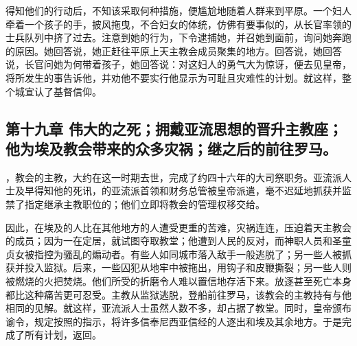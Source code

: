 得知他们的行动后，不知该采取何种措施，便尴尬地随着人群来到平原。一个妇人牵着一个孩子的手，披风拖曳，不合妇女的体统，仿佛有要事似的，从长官率领的士兵队列中挤了过去。注意到她的行为，下令逮捕她，并召她到面前，询问她奔跑的原因。她回答说，她正赶往平原上天主教会成员聚集的地方。回答说，她回答说，长官问她为何带着孩子，她回答说：对这妇人的勇气大为惊讶，便去见皇帝，将所发生的事告诉他，并劝他不要实行他显示为可耻且灾难性的计划。就这样，整个城宣认了基督信仰。\par


\subsection{第十九章 伟大的之死；拥戴亚流思想的晋升主教座；他为埃及教会带来的众多灾祸；继之后的前往罗马。}

，教会的主教，大约在这一时期去世，完成了约四十六年的大司祭职务。亚流派人士及早得知他的死讯，的亚流派首领和财务总管被皇帝派遣，毫不迟延地抓获并监禁了指定继承主教职位的；他们立即将教会的管理权移交给。\par

因此，在埃及的人比在其他地方的人遭受更重的苦难，灾祸连连，压迫着天主教会的成员；因为一在定居，就试图夺取教堂；他遭到人民的反对，而神职人员和圣童贞女被指控为骚乱的煽动者。有些人如同城市落入敌手一般逃脱了；另一些人被抓获并投入监狱。后来，一些囚犯从地牢中被拖出，用钩子和皮鞭撕裂；另一些人则被燃烧的火把焚烧。他们所受的折磨令人难以置信地存活下来。放逐甚至死亡本身都比这种痛苦更可忍受。主教从监狱逃脱，登船前往罗马，该教会的主教持有与他相同的见解。就这样，亚流派人士虽然人数不多，却占据了教堂。同时，皇帝颁布谕令，规定按照的指示，将许多信奉尼西亚信经的人逐出和埃及其余地方。于是完成了所有计划，返回。\par


